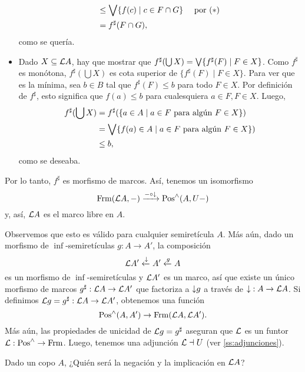 \begin{sol}
\begin{itemize}
\begin{align*}
            &\leq \Sup\{f(c) \mid c\in F\cap G\}
                && \text{ por $(*)$ } \\
            &= f^\sharp(F\cap G),
        \end{align*}
        como se quería.
        \item
        Dado $X\subseteq \cal LA$, hay que mostrar que
        $f^\sharp(\bigcup X)=\Sup\{f^\sharp(F) \mid F\in X\}$.
        Como $f^\sharp$ es monótona,
        $f^\sharp(\bigcup X)$ es cota superior de
        $\{f^\sharp(F) \mid F\in X\}$.
        Para ver que es la mínima, sea $b\in B$ tal que
        $f^\sharp(F)\leq b$ para todo $F\in X$.
        Por definición de $f^\sharp$, esto significa que
        $f(a)\leq b$ para cualesquiera $a\in F, F\in X$.
        Luego,
        \begin{align*}
            f^\sharp(\bigcup X)
            &= f^\sharp (
            \{a\in A \mid a\in F\text{ para algún }F\in X\}
            ) \\
            &=
            \Sup\{f(a)\in A \mid a\in F\text{ para algún }F\in X\}) \\
            &\leq b,
        \end{align*}
        como se deseaba.
    \end{itemize}
    Por lo tanto, $f^\sharp$ es morfismo de marcos.
    Así, tenemos un isomorfismo
    \[
        \Frm(\cal LA,-)\xto{-\circ \down} \Pos^{\inf}(A,U-)
    \]
    y, así, $\cal LA$ es el marco libre en $A$.
    
    Observemos que esto es válido para cualquier
    semiretícula $A$.
    Más aún, dado un morfismo de $\inf$-semiretículas
    $g:A\to A'$, la composición
    \[
        \cal LA' \lar \down A' \lar g A
    \]
    es un morfismo de $\inf$-semiretículas y
    $\cal LA'$ es un marco, así que
    existe un único morfismo de marcos
    $g^\sharp:\cal LA\to \cal LA'$ que factoriza a
    $\down g$ a través de $\down:A\to \cal LA$.
    Si definimos $\cal Lg=g^\sharp:\cal LA\to\cal LA'$,
    obtenemos una función
    \[
        \Pos^{\inf}(A,A') \to \Frm(\cal LA,\cal LA')
    .\]
    Más aún, las propiedades de unicidad de
    $\cal Lg=g^\sharp$ aseguran que $\cal L$ es un funtor
    $\cal L:\Pos^{\inf}\to\Frm$.
    Luego, tenemos una adjunción $\cal L\dashv U$
    (ver \ref{ss:adjunciones}).
\end{sol}

\begin{exe}%
  Dado un copo $A$,
  ¿Quién será la negación y la implicación en $\cal LA$?
\end{exe}


